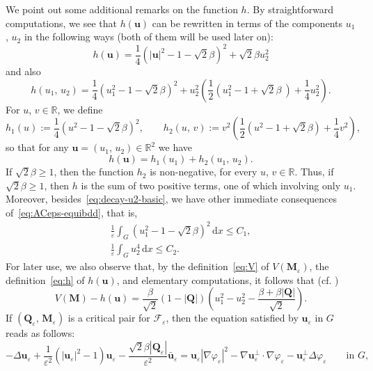 \documentclass[a4paper, 11pt, twoside, leqno]{article}
\theoremstyle{definition}              %
\theoremstyle{remark}                  %
\newcommand{\abs}[1]{\left| #1 \right|}                             %
\renewcommand{\d}{\mathrm{d}}
\newcommand{\R}{\mathbb{R}}
\newcommand{\Q}{\mathbf{Q}}
\newcommand{\M}{\mathbf{M}}
\renewcommand{\u}{\mathbf{u}}
\newcommand{\F}{\mathscr{F}}
\newcommand{\eps}{\varepsilon}
\begin{document}
We point out some additional remarks on the function $h$. 
By straightforward computations, we see that $h(\u)$ can 
be rewritten in terms of the components $u_1$, $u_2$ in the following 
ways (both of them will be used later on): 
\begin{equation}\label{eq:h-ter}
	h(\u) = \frac{1}{4}\left( \abs{\u}^2 - 1 - \sqrt{2}\beta \right)^2 + \sqrt{2}\beta u_2^2
\end{equation}
and also
\begin{equation}\label{eq:h-bis}
    h(u_1,\,u_2) = \frac{1}{4}\left(  u_1^2 - 1 - \sqrt{2} \beta \right)^2 + u_2^2 \left( \frac{1}{2}\left( u_1^2 - 1 + \sqrt{2} \beta \ \right) + \frac{1}{4}u_2^2 \right).
\end{equation}
For $u$, $v \in \R$, we define
\begin{equation}\label{eq:h1-h2}
    h_1(u) := \frac{1}{4}\left( u^2 - 1- \sqrt{2}\beta \right)^2, \qquad 
    h_2(u,\,v) := v^2\left( \frac{1}{2}\left(u^2 - 1 + \sqrt{2}\beta \right) + \frac{1}{4}v^2 \right),
\end{equation}
so that for any $\u = (u_1,\,u_2) \in \R^2$ we have
\[
    h(\u) = h_1(u_1) + h_2(u_1,\,u_2).
\]
If $\sqrt{2}\beta \geq 1$, then the function $h_2$ is non-negative, 
for every $u$, $v \in \R$.
Thus, if $\sqrt{2}\beta \geq 1$, then $h$ is the sum of two positive terms, one of which involving only $u_1$.
Moreover, besides~\eqref{eq:decay-u2-basic}, we have other 
immediate consequences of~\eqref{eq:ACeps-equibdd}, that is, 
\begin{gather}
	\frac{1}{\eps} \int_G \left(  u_1^2 - 1 - \sqrt{2} \beta \right)^2 \,{\d}x \leq C_1, \label{eq:decay-u1-to-well} \\
	\frac{1}{\eps} \int_G u_2^4 \,{\d}x \leq C_2. \label{eq:decay-u2^4-basic}
\end{gather}
For later use, we also observe that, by the definition~\eqref{eq:V} of $V(\M_\eps)$, the 
definition~\eqref{eq:h} of $h(\u)$, and elementary computations, 
it follows that (cf. \cite[Lemma~2.1]{CDS2})
\begin{equation}\label{eq:V-h}
	V(\M) - h(\u) 
	= \frac{\beta}{\sqrt{2}}\left(1 - \abs{\Q} \right)\left(u_1^2 - u_2^2 - \frac{\beta + \beta\abs{\Q}}{\sqrt{2}} \right).
\end{equation}
If $(\Q_\eps,\,\M_\eps)$ is a critical pair for $\F_\eps$, 
then the equation satisfied by $\u_\eps$ in $G$ reads as follows:
\begin{equation}\label{eq:EL-u}
    -\Delta \u_\eps + \frac{1}{\eps^2}\left(\abs{\u_\eps}^2-1\right) \u_\eps - \frac{\sqrt{2}\beta \abs{\Q_\eps}}{\eps^2} \bar{\u}_\eps = \u_\eps \abs{\nabla \varphi_\eps}^2 - \nabla \u_\eps^\perp \cdot \nabla \varphi_\eps - \u_\eps^\perp \Delta \varphi_\eps \qquad \mbox{in } G,
\end{equation}
\end{document}
